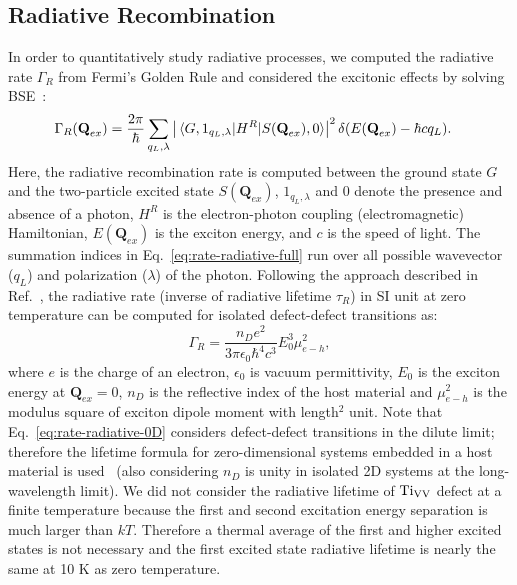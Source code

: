 \subsection{Radiative Recombination}
In order to quantitatively study radiative processes, we computed the radiative rate $\Gamma_R$ from Fermi's Golden Rule and considered the excitonic effects by solving BSE~\cite{wu2019dimensionality}:
\begin{align}
    \Gamma_R (\textbf{Q}_{ex}) &=
    \frac{2\pi}{\hbar}
    \sum_{q_L, \lambda}
    \left|
        \mel{G,1_{q_L,\lambda}}
        {H^R}
        {S(\textbf{Q}_{ex}),0}
    \right|^2
    \delta(E(\textbf{Q}_{ex}) -\hbar c q_L).
    \label{eq:rate-radiative-full}
\end{align}
Here, the radiative recombination rate is computed between the ground state $G$ and the two-particle excited state $S(\textbf{Q}_{ex})$, $1_{q_L,\lambda}$ and 0 denote the presence and absence of a photon, $H^R$ is the electron-photon coupling (electromagnetic) Hamiltonian,  $E(\textbf{Q}_{ex})$ is the exciton energy, and $c$ is the speed of light.
The summation indices in Eq.~\ref{eq:rate-radiative-full} run over all possible wavevector ($q_L$) and polarization ($\lambda$) of the photon.
Following the approach described in Ref.~\cite{wu2019dimensionality}, the radiative rate (inverse of radiative lifetime $\tau_R$) in SI unit at zero temperature can be computed for isolated defect-defect transitions as:
\begin{equation}
     \Gamma_R = \frac{n_D e^2}{3\pi\epsilon_0\hbar^4 c^3} E_0^3 \mu_{e-h}^2,
    \label{eq:rate-radiative-0D}
\end{equation}
where $e$ is the charge of an electron, $\epsilon_0$ is vacuum permittivity, $E_0$ is the exciton energy at $\textbf{Q}_{ex}=0$, $n_D$ is the reflective index of the host material and $\mu_{e-h}^2$ is the modulus square of exciton dipole moment with length$^2$ unit. Note that Eq.~\ref{eq:rate-radiative-0D} considers defect-defect transitions in the dilute limit; therefore the lifetime formula for zero-dimensional systems embedded in a host material is used~\cite{gupta2018two,mackoit2019carbon} (also considering $n_D$ is unity in isolated 2D systems at the long-wavelength limit). We did not consider the radiative lifetime of $\text{Ti}_{\text{V}\text{V}}$ defect at a finite temperature because the first and second excitation energy separation is much larger than $kT$. Therefore a thermal average of the first and higher excited states is not necessary and the first excited state radiative lifetime is nearly the same at 10 K as zero temperature.


